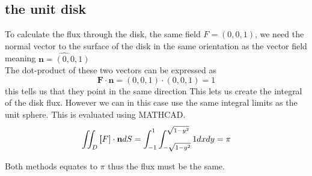 \subsection{the unit disk}
To calculate the flux through the disk, the same field $F = (0,0,1)$, we need the normal vector to the surface of the disk in the
same orientation as the vector field meaning $\hat{\textbf{n} = (0,0,1)}$\\
The dot-product of these two vectors can be expressed as 
\[ \textbf{F} \cdot \textbf{n} = (0,0,1) \cdot (0,0,1) = 1\]
this tells us that they point in the same direction
This lets us create the integral of the disk flux.
However we can in this case use the same integral limits as the unit sphere.
This is evaluated using MATHCAD.
\[\iint_D \textbf[F] \cdot \textbf{n} dS = \int_{-1}^{1} \int_{-\sqrt{1-y^2}}^{\sqrt{1-y^2}} 1dxdy = \pi\]

Both methods equates to $\pi$ thus the flux must be the same.
